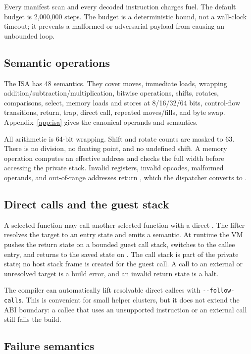 Every manifest scan and every decoded instruction charges fuel. The default
budget is 2,000,000 steps. The budget is a deterministic bound, not a wall-clock
timeout; it prevents a malformed or adversarial payload from causing an
unbounded loop.

\subsection{Semantic operations}

The ISA has 48 semantics. They cover moves, immediate loads, wrapping
addition/subtraction/multiplication, bitwise operations, shifts, rotates,
comparisons, select, memory loads and stores at 8/16/32/64 bits, control-flow
transitions, return, trap, direct call, repeated moves/fills, and byte swap.
Appendix~\ref{app:isa} gives the canonical operands and semantics.

All arithmetic is 64-bit wrapping. Shift and rotate counts are masked to 63.
There is no division, no floating point, and no undefined shift. A memory
operation computes an effective address and checks the full width before
accessing the private stack. Invalid registers, invalid opcodes, malformed
operands, and out-of-range addresses return , which the dispatcher
converts to .

\subsection{Direct calls and the guest stack}

A selected function may call another selected function with a direct
. The lifter resolves the target to an entry state and emits a
 semantic. At runtime the VM pushes the return state on a bounded guest
call stack, switches to the callee entry, and returns to the saved state on
. The call stack is part of the private state; no host stack frame is
created for the guest call. A call to an external or unresolved target is a build
error, and an invalid return state is a  halt.

The compiler can automatically lift resolvable direct callees with
\verb|--follow-calls|. This is convenient for small helper clusters, but it does
not extend the ABI boundary: a callee that uses an unsupported instruction or an
external call still fails the build.

\subsection{Failure semantics}

